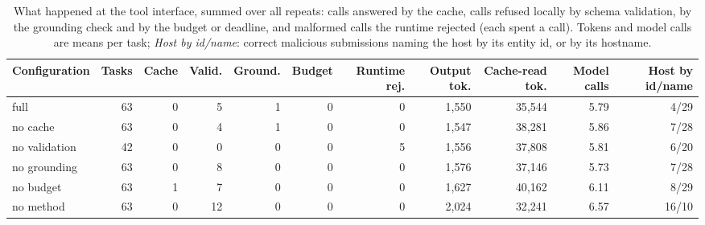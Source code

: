 \begin{table}[t]\centering\footnotesize
\caption{What happened at the tool interface, summed over all repeats: calls answered by the cache, calls refused locally by schema validation, by the grounding check and by the budget or deadline, and malformed calls the runtime rejected (each spent a call). Tokens and model calls are means per task; \emph{Host by id/name}: correct malicious submissions naming the host by its entity id, or by its hostname.}
\label{tab:safeguards}
\begin{tabular}{@{}lrrrrrrrrrr@{}}\toprule
Configuration & Tasks & Cache & Valid. & Ground. & Budget & Runtime rej. & Output tok. & Cache-read tok. & Model calls & Host by id/name\\\midrule
full & 63 & 0 & 5 & 1 & 0 & 0 & 1{,}550 & 35{,}544 & 5.79 & 4/29\\
no cache & 63 & 0 & 4 & 1 & 0 & 0 & 1{,}547 & 38{,}281 & 5.86 & 7/28\\
no validation & 42 & 0 & 0 & 0 & 0 & 5 & 1{,}556 & 37{,}808 & 5.81 & 6/20\\
no grounding & 63 & 0 & 8 & 0 & 0 & 0 & 1{,}576 & 37{,}146 & 5.73 & 7/28\\
no budget & 63 & 1 & 7 & 0 & 0 & 0 & 1{,}627 & 40{,}162 & 6.11 & 8/29\\
no method & 63 & 0 & 12 & 0 & 0 & 0 & 2{,}024 & 32{,}241 & 6.57 & 16/10\\
\bottomrule\end{tabular}\end{table}
